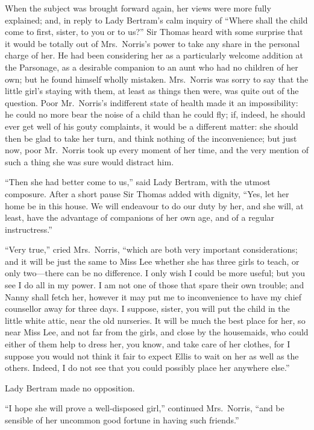 When the subject was brought forward again, her views
were more fully explained; and, in reply to Lady Bertram's
calm inquiry of ``Where shall the child come to first,
sister, to you or to us?''  Sir Thomas heard with some
surprise that it would be totally out of Mrs.\ Norris's
power to take any share in the personal charge of her.
He had been considering her as a particularly welcome
addition at the Parsonage, as a desirable companion
to an aunt who had no children of her own; but he found
himself wholly mistaken.  Mrs.\ Norris was sorry to say
that the little girl's staying with them, at least
as things then were, was quite out of the question.
Poor Mr.\ Norris's indifferent state of health made it
an impossibility:  he could no more bear the noise of a child
than he could fly; if, indeed, he should ever get well
of his gouty complaints, it would be a different matter:
she should then be glad to take her turn, and think nothing
of the inconvenience; but just now, poor Mr.\ Norris
took up every moment of her time, and the very mention
of such a thing she was sure would distract him.

``Then she had better come to us,'' said Lady Bertram,
with the utmost composure.  After a short pause Sir Thomas
added with dignity, ``Yes, let her home be in this house.
We will endeavour to do our duty by her, and she will,
at least, have the advantage of companions of her own age,
and of a regular instructress.''

``Very true,'' cried Mrs.\ Norris, ``which are both very
important considerations; and it will be just the same
to Miss Lee whether she has three girls to teach,
or only two---there can be no difference.  I only wish I
could be more useful; but you see I do all in my power.
I am not one of those that spare their own trouble;
and Nanny shall fetch her, however it may put me
to inconvenience to have my chief counsellor away for
three days.  I suppose, sister, you will put the child
in the little white attic, near the old nurseries.
It will be much the best place for her, so near Miss Lee,
and not far from the girls, and close by the housemaids,
who could either of them help to dress her, you know,
and take care of her clothes, for I suppose you would not
think it fair to expect Ellis to wait on her as well as
the others.  Indeed, I do not see that you could possibly
place her anywhere else.''

Lady Bertram made no opposition.

``I hope she will prove a well-disposed girl,''
continued Mrs.\ Norris, ``and be sensible of her uncommon
good fortune in having such friends.''

